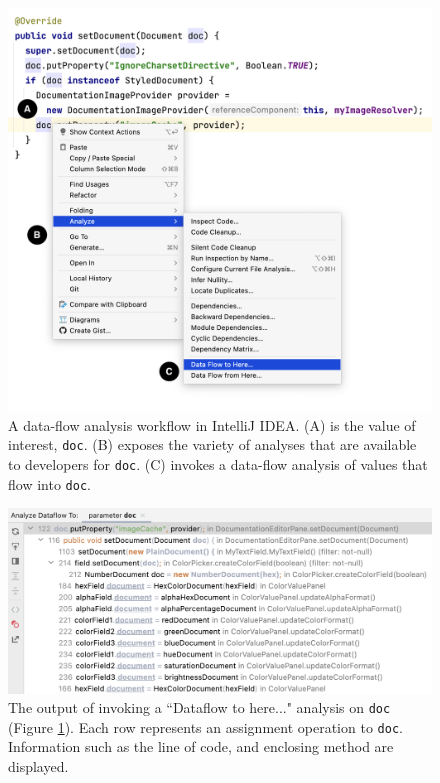 \begin{figure}[ht]
\centering
\includegraphics[width=\textwidth]{./figs/intellij-dataflow.png}
\caption{
  A data-flow analysis workflow in IntelliJ IDEA. (A) is the value of
  interest, \texttt{doc}. (B) exposes the variety of analyses that are
  available to developers for \texttt{doc}. (C) invokes a data-flow analysis
  of values that flow into \texttt{doc}.
}
\label{fig:IntelliJDataflow}
\end{figure}

\begin{figure}[ht]
\centering
\includegraphics[width=\textwidth]{./figs/intellij-dataflow-result.png}
\caption{
  The output of invoking a ``Dataflow to here..." analysis on \texttt{doc}
  (Figure \ref{fig:IntelliJDataflow}). Each row represents an assignment
  operation to \texttt{doc}. Information such as the line of code, and 
  enclosing method are displayed.
}
\label{fig:IntelliJDataflowResult}
\end{figure}

